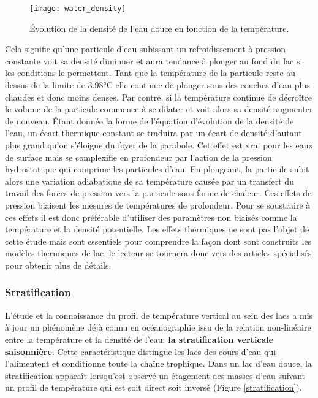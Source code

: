 \begin{figure}[h!]
 \centerline{\texttt{[image: water\_density]}}
 \caption{Évolution de la densité de l'eau douce en fonction de la température.}
 \label{water_density}
\end{figure}

\noindent Cela signifie qu'une particule d'eau subissant un refroidissement à pression constante voit sa densité diminuer et aura tendance à plonger au fond du lac si les conditions le permettent. Tant que la température de la particule reste au dessus de la limite de 3.98°C elle continue de plonger sous des couches d'eau plus chaudes et donc moins denses. Par contre, si la température continue de décroître le volume de la particule commence à se dilater et voit alors sa densité augmenter de nouveau. Étant donnée la forme de l'équation d'évolution de la densité de l'eau, un écart thermique constant se traduira par un écart de densité d'autant plus grand qu'on s'éloigne du foyer de la parabole. Cet effet est vrai pour les eaux de surface mais se complexifie en profondeur par l'action de la pression hydrostatique qui comprime les particules d'eau. En plongeant, la particule subit alors une variation adiabatique de sa température causée par un transfert du travail des forces de pression vers la particule sous forme de chaleur. Ces effets de pression biaisent les mesures de températures de profondeur. Pour se soustraire à ces effets il est donc préférable d'utiliser des paramètres non biaisés comme la température et la densité potentielle. Les effets thermiques ne sont pas l'objet de cette étude mais sont essentiels pour comprendre la façon dont sont construits les modèles thermiques de lac, le lecteur se tournera donc vers des articles spécialisés pour obtenir plus de détails.

\subsubsection{{\selectfont Stratification}}

L'étude et la connaissance du profil de température vertical au sein des lacs a mis à jour un phénomène déjà connu en océanographie issu de la relation non-linéaire entre la température et la densité de l'eau: \textbf{la stratification verticale saisonnière}. Cette caractéristique distingue les lacs des cours d'eau qui l'alimentent et conditionne toute la chaîne trophique.
Dans un lac d'eau douce, la stratification apparaît lorsqu'est observé un étagement des masses d'eau suivant un profil de température qui est soit direct soit inversé (Figure \ref{stratification}). \\

